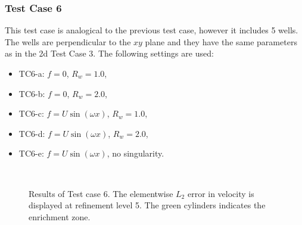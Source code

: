 \subsubsection{Test Case 6}
This test case is analogical to the previous test case, however it includes 5 wells.
The wells are perpendicular to the $xy$ plane and they have the same parameters as in the 2d Test Case 3.
The following settings are used:
\begin{itemize}
    \item TC6-a: $f=0$, $R_w=1.0$,
    \item TC6-b: $f=0$, $R_w=2.0$,
    \item TC6-c: $f=U\sin(\omega x)$, $R_w=1.0$,
    \item TC6-d: $f=U\sin(\omega x)$, $R_w=2.0$,
    \item TC6-e: $f=U\sin(\omega x)$, no singularity.
\end{itemize}
%
\begin{figure}[!htb]
    \centering
     \\
    \caption[Error distribution in Test case 6.]
    {Results of Test case 6. The elementwise $L_2$ error in velocity is displayed at refinement level 5.
    The green cylinders indicates the enrichment zone. }
    \label{fig:mh_tc6_error}
\end{figure}
%

